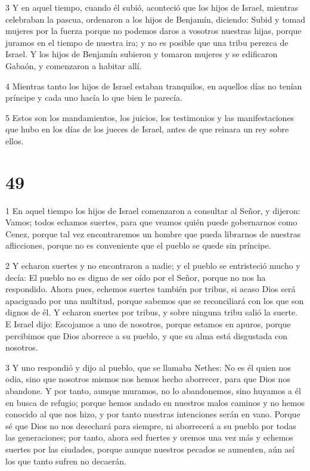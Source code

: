 \par 3 Y en aquel tiempo, cuando él subió, aconteció que los hijos de Israel, mientras celebraban la pascua, ordenaron a los hijos de Benjamín, diciendo: Subid y tomad mujeres por la fuerza porque no podemos daros a vosotros nuestras hijas, porque juramos en el tiempo de nuestra ira; y no es posible que una tribu perezca de Israel. Y los hijos de Benjamín subieron y tomaron mujeres y se edificaron Gabaón, y comenzaron a habitar allí.

\par 4 Mientras tanto los hijos de Israel estaban tranquilos, en aquellos días no tenían príncipe y cada uno hacía lo que bien le parecía.

\par 5 Estos son los mandamientos, los juicios, los testimonios y las manifestaciones que hubo en los días de los jueces de Israel, antes de que reinara un rey sobre ellos.

\chapter{49}

\par 1 En aquel tiempo los hijos de Israel comenzaron a consultar al Señor, y dijeron: Vamos; todos echamos suertes, para que veamos quién puede gobernarnos como Cenez, porque tal vez encontraremos un hombre que pueda librarnos de nuestras aflicciones, porque no es conveniente que el pueblo se quede sin príncipe.

\par 2 Y echaron suertes y no encontraron a nadie; y el pueblo se entristeció mucho y decía: El pueblo no es digno de ser oído por el Señor, porque no nos ha respondido. Ahora pues, echemos suertes también por tribus, si acaso Dios será apaciguado por una multitud, porque sabemos que se reconciliará con los que son dignos de él. Y echaron suertes por tribus, y sobre ninguna tribu salió la suerte. E Israel dijo: Escojamos a uno de nosotros, porque estamos en apuros, porque percibimos que Dios aborrece a su pueblo, y que su alma está disgustada con nosotros.

\par 3 Y uno respondió y dijo al pueblo, que se llamaba Nethes: No es él quien nos odia, sino que nosotros mismos nos hemos hecho aborrecer, para que Dios nos abandone. Y por tanto, aunque muramos, no lo abandonemos, sino huyamos a él en busca de refugio; porque hemos andado en nuestros malos caminos y no hemos conocido al que nos hizo, y por tanto nuestras intenciones serán en vano. Porque sé que Dios no nos desechará para siempre, ni aborrecerá a su pueblo por todas las generaciones; por tanto, ahora sed fuertes y oremos una vez más y echemos suertes por las ciudades, porque aunque nuestros pecados se aumenten, aún así los que tanto sufren no decaerán.

